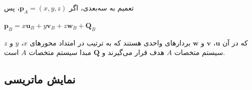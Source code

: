 {\begin{spacing}{1.5}
        تعمیم به سه‌بعدی، اگر $\textbf{p}_{A}=(x, y, z)$، پس

        \begin{center}
            $\textbf{p}_{B}=x\textbf{u}_{B}+y\textbf{v}_{B}+z\textbf{w}_{B}+\textbf{Q}_{B}$
        \end{center}

        که در آن $\textbf{u}$، $\textbf{v}$ و $\textbf{w}$ بردارهای واحدی هستند که به ترتیب در امتداد محورهای $x$، $y$ و $z$ سیستم متخصات $A$ هدف قرار می‌گیرند و $\textbf{Q}$ مبدا سیستم متخصات $A$ است.
    \end{spacing}
}

\subsection{\textbf{نمایش ماتریسی}}
\label{subsec:3.4.3}
